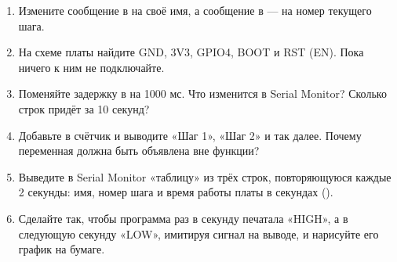 \begin{tasks}
\begin{enumerate}
\item {} Измените сообщение в  на своё имя, а сообщение в  --- на номер текущего шага.
\item {} На схеме платы найдите GND, 3V3, GPIO4, BOOT и RST (EN). Пока ничего к ним не подключайте.
\item {} Поменяйте задержку в  на 1000 мс. Что изменится в Serial Monitor? Сколько строк придёт за 10 секунд?
\item {} Добавьте в  счётчик и выводите «Шаг 1», «Шаг 2» и так далее. Почему переменная должна быть объявлена вне функции?
\item {} Выведите в Serial Monitor «таблицу» из трёх строк, повторяющуюся каждые 2 секунды: имя, номер шага и время работы платы в секундах ().
\item {} Сделайте так, чтобы программа раз в секунду печатала «HIGH», а в следующую секунду «LOW», имитируя сигнал на выводе, и нарисуйте его график на бумаге.
\end{enumerate}
\end{tasks}

\renewcommand{\thelisting}{\thesection.\arabic{listing}}
